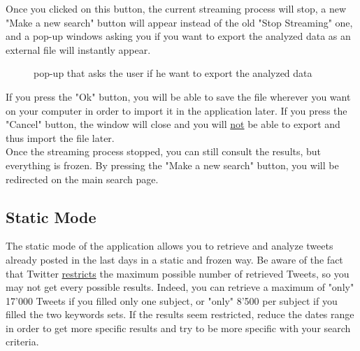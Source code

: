 \documentclass[a4paper,11pt]{report}
\begin{document}
\begin{enumerate}
	Once you clicked on this button, the current streaming process will stop, a new "Make a new search" button will appear instead of the old "Stop Streaming" one, and a pop-up windows asking you if you want to export the analyzed data as an external file will instantly appear.
	\begin{figure}[H]
	\vspace{-5pt}
	\begin{center}
	\vspace{-5pt}
	\caption{pop-up that asks the user if he want to export the analyzed data}
	\end{center}
	\end{figure}
	\vspace{-10pt}
	
	If you press the "Ok" button, you will be able to save the file wherever you want on your computer in order to import it in the application later. If you press the "Cancel" button, the window will close and you will \underline{not} be able to export and thus import the file later.\\
	
	Once the streaming process stopped, you can still consult the results, but everything is frozen. By pressing the "Make a new search" button, you will be redirected on the main search page.
\end{enumerate}
\newpage

\subsection{Static Mode}
The static mode of the application allows you to retrieve and analyze tweets already posted in the last days in a static and frozen way. Be aware of the fact that Twitter \underline{restricts} the maximum possible number of retrieved Tweets, so you may not get every possible results. Indeed, you can retrieve a maximum of "only" 17'000 Tweets if you filled only one subject, or "only" 8'500 per subject if you filled the two keywords sets. If the results seem restricted, reduce the dates range in order to get more specific results and try to be more specific with your search criteria. 
\end{document}
